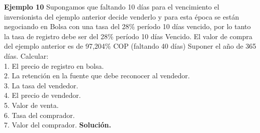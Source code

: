 \newpage
	\textbf{Ejemplo 10}\newline
Supongamos que faltando 10 días para el vencimiento el inversionista del ejemplo anterior decide venderlo y para esta época se están negociando en Bolsa con una tasa del 28\% período 10 días vencido, por lo tanto la tasa de registro debe ser del 28\% período 10 días Vencido. El valor de compra del ejemplo anterior es de 97,204\% COP (faltando 40 días) Suponer el año de 365 días. Calcular:\\
1. El precio de registro en bolsa. \\
2. La retención en la fuente que debe reconocer al vendedor. \\
3. La tasa del vendedor. \\
4. El precio de vendedor. \\
5. Valor de venta.  \\
6. Tasa del comprador. \\
7. Valor del comprador. \newline
\textbf{Solución.
\newline}
